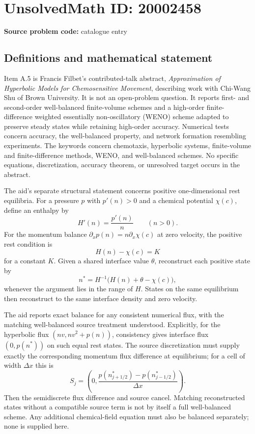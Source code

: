 \documentclass[11pt]{article}
\begin{document}
\section*{UnsolvedMath ID: 20002458}
\textbf{Source problem code:} catalogue entry
\subsection{Definitions and mathematical statement}
Item A.5 is Francis Filbet's contributed-talk abstract, \emph{Approximation of Hyperbolic Models for Chemosensitive Movement}, describing work with Chi-Wang Shu of Brown University. It is not an open-problem question. It reports first- and second-order well-balanced finite-volume schemes and a high-order finite-difference weighted essentially non-oscillatory (WENO) scheme adapted to preserve steady states while retaining high-order accuracy. Numerical tests concern accuracy, the well-balanced property, and network formation resembling experiments. The keywords concern chemotaxis, hyperbolic systems, finite-volume and finite-difference methods, WENO, and well-balanced schemes. No specific equations, discretization, accuracy theorem, or unresolved target occurs in the abstract.

The aid's separate structural statement concerns positive one-dimensional rest equilibria. For a pressure $p$ with $p'(n)>0$ and a chemical potential $\chi(c)$, define an enthalpy by
\[
H'(n)=\frac{p'(n)}n\qquad(n>0).
\]
For the momentum balance $\partial_xp(n)=n\partial_x\chi(c)$ at zero velocity, the positive rest condition is
\[
H(n)-\chi(c)=K
\]
for a constant $K$. Given a shared interface value $\theta$, reconstruct each positive state by
\[
n^*=H^{-1}\bigl(H(n)+\theta-\chi(c)\bigr),
\]
whenever the argument lies in the range of $H$. States on the same equilibrium then reconstruct to the same interface density and zero velocity.

The aid reports exact balance for any consistent numerical flux, with the matching well-balanced source treatment understood. Explicitly, for the hyperbolic flux $(nv,nv^2+p(n))$, consistency gives interface flux $(0,p(n^*))$ on such equal rest states. The source discretization must supply exactly the corresponding momentum flux difference at equilibrium; for a cell of width $\Delta x$ this is
\[
S_j=\left(0,\frac{p(n^*_{j+1/2})-p(n^*_{j-1/2})}{\Delta x}\right).
\]
Then the semidiscrete flux difference and source cancel. Matching reconstructed states without a compatible source term is not by itself a full well-balanced scheme. Any additional chemical-field equation must also be balanced separately; none is supplied here.
\end{document}
